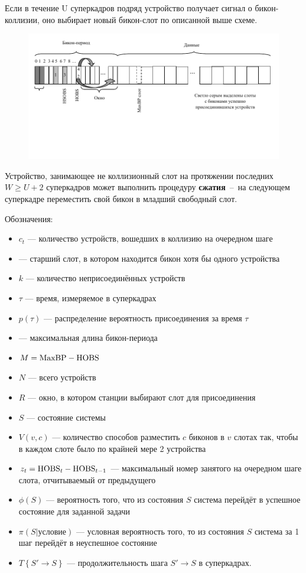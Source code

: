 Если в течение U суперкадров подряд устройство получает сигнал о бикон-коллизии, оно выбирает новый бикон-слот по описанной выше схеме.

\begin{figure}[h]
\includegraphics[width=\textwidth]{Wimedia4.pdf}
\end{figure}

Устройство, занимающее не коллизионный слот \HOBS  на протяжении последних $W \ge U+2$ суперкадров может выполнить процедуру \textbf{сжатия}~--~на следующем суперкадре переместить свой бикон в младший свободный слот.

Обозначения:
\begin{itemize}
\item $c_t$ --- количество устройств, вошедших в коллизию на очередном шаге
\item \HOBS --- старший слот, в котором находится бикон хотя бы одного устройства
\item $k$ --- количество неприсоединённых устройств
\item $\tau$ --- время, измеряемое в суперкадрах
\item $p(\tau)$ --- распределение вероятность присоединения за время $\tau$
\item \MaxBP --- максимальная длина бикон-периода
\item $M = \text{MaxBP} - \text{HOBS}$
\item $N$ --- всего устройств
\item $R$ --- окно, в котором станции выбирают слот для присоединения
\item $S$ --- состояние системы
\item $V(v, c)$ --- количество способов разместить $c$ биконов в $v$ слотах так, чтобы в каждом слоте было по крайней мере 2 устройства
\item $z_t = \text{HOBS}_t - \text{HOBS}_{t-1}$ --- максимальный номер занятого на очередном шаге слота, отчитываемый от предыдущего \HOBS
\item $\phi(S)$ --- вероятность того, что из состояния $S$ система перейдёт в успешное состояние для заданной задачи
\item $\pi(S|условие)$ --- условная вероятность того, то из состояния $S$ система за 1 шаг перейдёт в неуспешное состояние
\item $T\left\{S' \to S \right\}$ --- продолжительность шага $S'\to S$ в суперкадрах.
\end{itemize}

